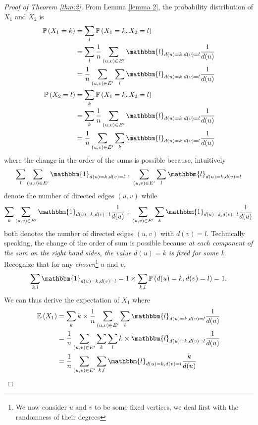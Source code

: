 \documentclass[12pt,reqno, a4]{amsart}
\begin{document}
\begin{proof}[Proof of Theorem \ref{thm:2}]
    From Lemma \ref{lemma 2}, the probability distribution of $X_1$ and $X_2$ is 
    \begin{align*}
        \pr{X_1 = k} &= \sum_{l} \pr{X_1 = k, X_2=l} \\&= \sum_{l} \frac{1}{n} \sum_{(u, v) \in E'}\mathbbm{l}_{d(u) = k, d(v) = l} \frac{1}{d(u)} \\&= \frac{1}{n} \sum_{(u, v) \in E'}\sum_{l} \mathbbm{l}_{d(u) = k, d(v) = l} \frac{1}{d(u)}\\
        \pr{X_2 = l} &= \sum_{k} \pr{X_1 = k, X_2=l} \\ & = \sum_k \frac{1}{n} \sum_{(u, v) \in E'} \mathbbm{l}_{d(u) = k, d(v) = l} \frac{1}{d(u)} \\&= \frac{1}{n} \sum_{(u, v) \in E'} \sum_{k} \mathbbm{l}_{d(u) = k, d(v) = l} \frac{1}{d(u)}
    \end{align*}
    where the change in the order of the sums is possible because, intuitively
    \[
    \sum_l \sum_{(u, v) \in E'} \mathbbm{1}_{d(u) = k, d(v) = l}\ ,\  \sum_{(u, v) \in E'}\sum_{l} \mathbbm{l}_{d(u) = k, d(v) = l}
    \] denote the number of directed edges $(u,v)$ while
    \begin{align*}
            \sum_k \sum_{(u, v) \in E'} \mathbbm{1}_{d(u) = k, d(v) = l} \frac{1}{d(u)} \ ; \ \sum_{(u, v) \in E'} \sum_k   \mathbbm{1}_{d(u) = k, d(v) = l} \frac{1}{d(u)} 
    \end{align*}
    both denotes the number of directed edges $(u, v)$ with $d(v) = l$. Technically speaking, the change of the order of sum is possible because \textit{at each component of the sum on the right hand sides, the value $d(u) = k$ is fixed for some k}.\\
    Recognize that for any \textit{chosen}\footnote{We now consider $u$ and $v$ to be some fixed vertices, we deal first with the randomness of their degrees} $u$ and $v$, \[\sum_{k, l} \mathbbm{1}_{d(u) = k, d(v) = l} = 1 \times \sum_{k,l} \pr{d(u) = k, d(v) = l} =  1. \] We can thus derive the expectation of $X_1$ where
\begin{align*}
    \E{X_1} &= \sum_{k} k \times \frac{1}{n} \sum_{(u, v) \in E'} \sum_{l}\mathbbm{l}_{d(u) = k, d(v) = l} \frac{1}{d(u)}\\
    & = \frac{1}{n}\sum_{(u, v) \in E'} \sum_k \sum_l k \times\mathbbm{l}_{d(u) = k, d(v) = l} \frac{1}{d(u)} \\
    & = \frac{1}{n} \sum_{(u, v) \in E'} \sum_{k, l} \mathbbm{l}_{d(u) = k, d(v) = l} \frac{k}{d(u)} \\

\end{align*}
\end{proof}
\end{document}
